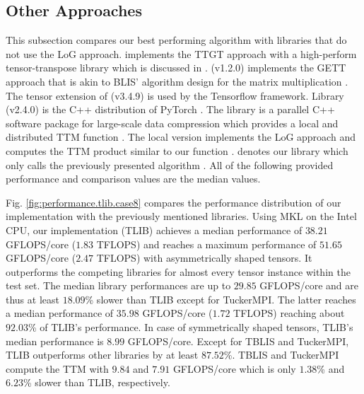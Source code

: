 \subsection{Other Approaches}
This subsection compares our best performing algorithm with libraries that do not use the LoG approach.
 implements the TTGT approach with a high-perform tensor-transpose library  which is discussed in \cite{springer:2018:design}.
 (v1.2.0) implements the GETT approach that is akin to BLIS' algorithm design for the matrix multiplication \cite{matthews:2018:high}.
The tensor extension of  (v3.4.9) is used by the Tensorflow framework.
Library  (v2.4.0) is the C++ distribution of PyTorch \cite{paszke:2019:pytorch}.
The  library is a parallel C++ software package for large-scale data compression which provides a local and distributed TTM function \cite{ballard:2020:tuckermpi}.
The local version implements the LoG approach and computes the TTM product similar to our function .
 denotes our library which only calls the previously presented algorithm .
All of the following provided performance and comparison values are the median values.

Fig. \ref{fig:performance.tlib.case8} compares the performance distribution of our implementation with the previously mentioned libraries.
Using MKL on the Intel CPU, our implementation (TLIB) achieves a median performance of $38.21$ GFLOPS/core ($1.83$ TFLOPS) and reaches a maximum performance of $51.65$ GFLOPS/core ($2.47$ TFLOPS) with asymmetrically shaped tensors.
It outperforms the competing libraries for almost every tensor instance within the test set.
The median library performances are up to $29.85$ GFLOPS/core and are thus at least $18.09$\% slower than TLIB except for TuckerMPI.
The latter reaches a median performance of $35.98$ GFLOPS/core ($1.72$ TFLOPS) reaching about $92.03$\% of TLIB's performance.
In case of symmetrically shaped tensors, TLIB's median performance is $8.99$ GFLOPS/core.
Except for TBLIS and TuckerMPI, TLIB outperforms other libraries by at least $87.52$\%.
TBLIS and TuckerMPI compute the TTM with $9.84$ and $7.91$ GFLOPS/core which is only $1.38$\% and $6.23$\% slower than TLIB, respectively.

